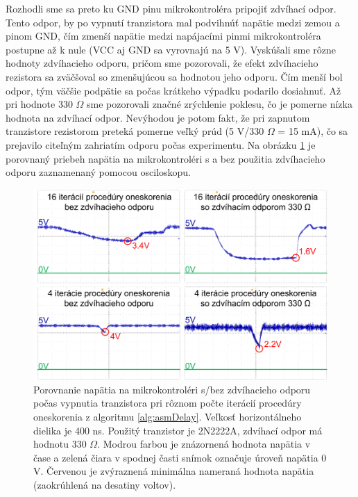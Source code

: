 Rozhodli sme sa preto ku GND pinu mikrokontroléra pripojiť zdvíhací odpor. Tento odpor, by po vypnutí tranzistora mal podvihnúť napätie medzi zemou a pinom GND, čím zmenší napätie medzi napájacími pinmi mikrokontroléra postupne až k nule (VCC aj GND sa vyrovnajú na 5 V). Vyskúšali sme rôzne hodnoty zdvíhacieho odporu, pričom sme pozorovali, že efekt zdvíhacieho rezistora sa zväčšoval so zmenšujúcou sa hodnotou jeho odporu. Čím menší bol odpor, tým väčšie podpätie sa počas krátkeho výpadku podarilo dosiahnuť. Až pri hodnote 330 $\Omega$ sme pozorovali značné zrýchlenie poklesu, čo je pomerne nízka hodnota na zdvíhací odpor. Nevýhodou je potom fakt, že pri zapnutom tranzistore rezistorom preteká pomerne veľký prúd (5 V/330 $\Omega$ = 15 mA), čo sa prejavilo citeľným zahriatím odporu počas experimentu. Na obrázku \ref{obr:vccAnalysis} je porovnaný priebeh napätia na mikrokontroléri s a bez použitia zdvíhacieho odporu zaznamenaný pomocou osciloskopu.

\begin{figure}
    \centerline{\includegraphics[width=1\textwidth]{images/vccAnalysis.png}}
    \caption[Porovnanie napätia na mikrokontroléri s/bez zdvíhacieho odporu]{Porovnanie napätia na mikrokontroléri s/bez zdvíhacieho odporu počas vypnutia tranzistora pri rôznom počte iterácií procedúry oneskorenia z algoritmu \ref{alg:asmDelay}. Veľkosť horizontálneho dielika je 400 ns. Použitý tranzistor je 2N2222A, zdvíhací odpor má hodnotu 330 $\Omega$. Modrou farbou je znázornená hodnota napätia v čase a zelená čiara v spodnej časti snímok označuje úroveň napätia 0 V. Červenou je zvýraznená minimálna nameraná hodnota napätia (zaokrúhlená na desatiny voltov).}
    \label{obr:vccAnalysis}
\end{figure}

